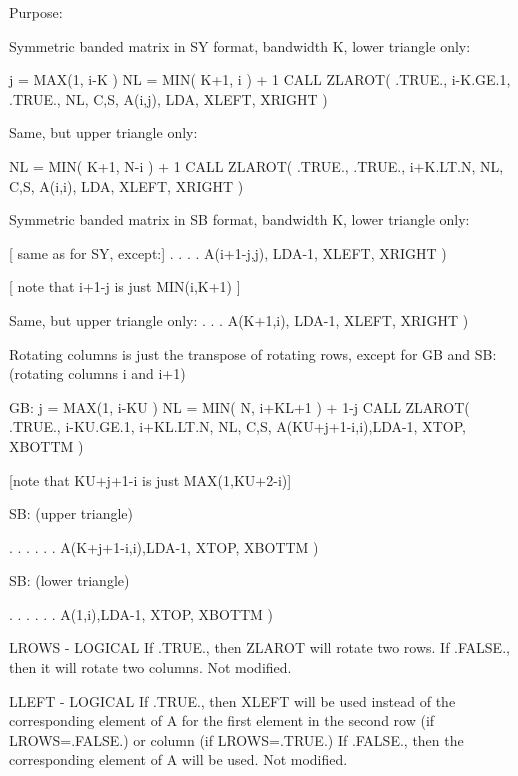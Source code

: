 \begin{DoxyParagraph}{Purpose\+: }
\begin{DoxyVerb}

      Symmetric banded matrix in SY format, bandwidth K,
      lower triangle only:

              j = MAX(1, i-K )
              NL = MIN( K+1, i ) + 1
              CALL ZLAROT( .TRUE., i-K.GE.1, .TRUE., NL, C,S,
                      A(i,j), LDA, XLEFT, XRIGHT )

      Same, but upper triangle only:

              NL = MIN( K+1, N-i ) + 1
              CALL ZLAROT( .TRUE., .TRUE., i+K.LT.N, NL, C,S,
                      A(i,i), LDA, XLEFT, XRIGHT )

      Symmetric banded matrix in SB format, bandwidth K,
      lower triangle only:

              [ same as for SY, except:]
                  . . . .
                      A(i+1-j,j), LDA-1, XLEFT, XRIGHT )

              [ note that i+1-j is just MIN(i,K+1) ]

      Same, but upper triangle only:
                  . . .
                      A(K+1,i), LDA-1, XLEFT, XRIGHT )

      Rotating columns is just the transpose of rotating rows, except
      for GB and SB: (rotating columns i and i+1)

      GB:
              j = MAX(1, i-KU )
              NL = MIN( N, i+KL+1 ) + 1-j
              CALL ZLAROT( .TRUE., i-KU.GE.1, i+KL.LT.N, NL, C,S,
                      A(KU+j+1-i,i),LDA-1, XTOP, XBOTTM )

              [note that KU+j+1-i is just MAX(1,KU+2-i)]

      SB: (upper triangle)

                   . . . . . .
                      A(K+j+1-i,i),LDA-1, XTOP, XBOTTM )

      SB: (lower triangle)

                   . . . . . .
                      A(1,i),LDA-1, XTOP, XBOTTM )\end{DoxyVerb}
 \begin{DoxyVerb}  LROWS  - LOGICAL
           If .TRUE., then ZLAROT will rotate two rows.  If .FALSE.,
           then it will rotate two columns.
           Not modified.

  LLEFT  - LOGICAL
           If .TRUE., then XLEFT will be used instead of the
           corresponding element of A for the first element in the
           second row (if LROWS=.FALSE.) or column (if LROWS=.TRUE.)
           If .FALSE., then the corresponding element of A will be
           used.
           Not modified.


\end{DoxyVerb}
\end{DoxyParagraph}
